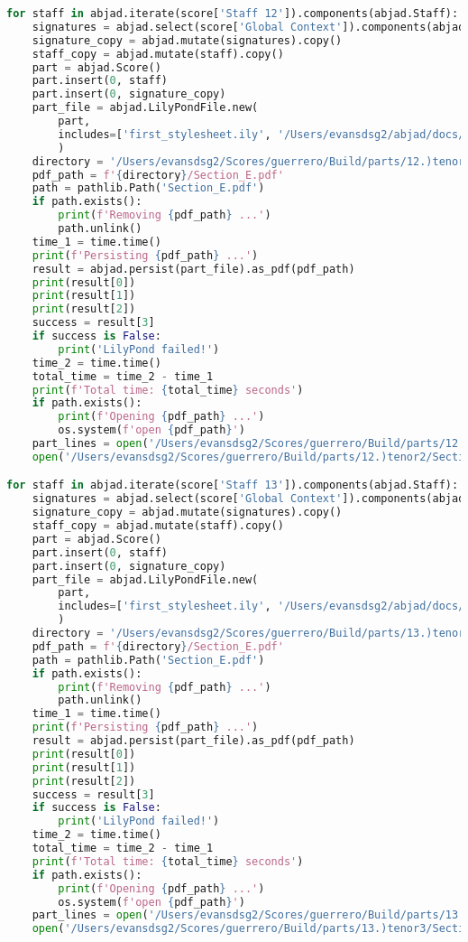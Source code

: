 \begin{lstlisting}[language=Python, caption=Invocation Source Code]
for staff in abjad.iterate(score['Staff 12']).components(abjad.Staff):
    signatures = abjad.select(score['Global Context']).components(abjad.Staff)
    signature_copy = abjad.mutate(signatures).copy()
    staff_copy = abjad.mutate(staff).copy()
    part = abjad.Score()
    part.insert(0, staff)
    part.insert(0, signature_copy)
    part_file = abjad.LilyPondFile.new(
        part,
        includes=['first_stylesheet.ily', '/Users/evansdsg2/abjad/docs/source/_stylesheets/abjad.ily'],
        )
    directory = '/Users/evansdsg2/Scores/guerrero/Build/parts/12.)tenor2'
    pdf_path = f'{directory}/Section_E.pdf'
    path = pathlib.Path('Section_E.pdf')
    if path.exists():
        print(f'Removing {pdf_path} ...')
        path.unlink()
    time_1 = time.time()
    print(f'Persisting {pdf_path} ...')
    result = abjad.persist(part_file).as_pdf(pdf_path)
    print(result[0])
    print(result[1])
    print(result[2])
    success = result[3]
    if success is False:
        print('LilyPond failed!')
    time_2 = time.time()
    total_time = time_2 - time_1
    print(f'Total time: {total_time} seconds')
    if path.exists():
        print(f'Opening {pdf_path} ...')
        os.system(f'open {pdf_path}')
    part_lines = open('/Users/evansdsg2/Scores/guerrero/Build/parts/12.)tenor2/Section_E.ly').readlines()
    open('/Users/evansdsg2/Scores/guerrero/Build/parts/12.)tenor2/Section_E.ly', 'w').writelines(part_lines[15:-1])

for staff in abjad.iterate(score['Staff 13']).components(abjad.Staff):
    signatures = abjad.select(score['Global Context']).components(abjad.Staff)
    signature_copy = abjad.mutate(signatures).copy()
    staff_copy = abjad.mutate(staff).copy()
    part = abjad.Score()
    part.insert(0, staff)
    part.insert(0, signature_copy)
    part_file = abjad.LilyPondFile.new(
        part,
        includes=['first_stylesheet.ily', '/Users/evansdsg2/abjad/docs/source/_stylesheets/abjad.ily'],
        )
    directory = '/Users/evansdsg2/Scores/guerrero/Build/parts/13.)tenor3'
    pdf_path = f'{directory}/Section_E.pdf'
    path = pathlib.Path('Section_E.pdf')
    if path.exists():
        print(f'Removing {pdf_path} ...')
        path.unlink()
    time_1 = time.time()
    print(f'Persisting {pdf_path} ...')
    result = abjad.persist(part_file).as_pdf(pdf_path)
    print(result[0])
    print(result[1])
    print(result[2])
    success = result[3]
    if success is False:
        print('LilyPond failed!')
    time_2 = time.time()
    total_time = time_2 - time_1
    print(f'Total time: {total_time} seconds')
    if path.exists():
        print(f'Opening {pdf_path} ...')
        os.system(f'open {pdf_path}')
    part_lines = open('/Users/evansdsg2/Scores/guerrero/Build/parts/13.)tenor3/Section_E.ly').readlines()
    open('/Users/evansdsg2/Scores/guerrero/Build/parts/13.)tenor3/Section_E.ly', 'w').writelines(part_lines[15:-1])


\end{lstlisting}
